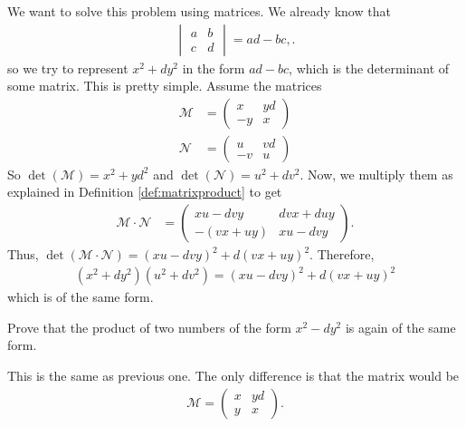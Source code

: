 \documentclass{subfile}
\begin{document}
\begin{solution}
We want to solve this problem using matrices. We already know that
	\begin{align*}
		\begin{vmatrix}
			a&b\\
			c&d
		\end{vmatrix} = ad-bc,
	.\end{align*}
so we try to represent $x^2+dy^2$ in the form $ad-bc$, which is the determinant of some matrix. This is pretty simple. Assume the matrices
	\begin{align*}
		\mathcal{M}
			& =
			\begin{pmatrix}
				x & yd\\
				-y & x
			\end{pmatrix}\\
		\mathcal{N}
			& =
			\begin{pmatrix}
				u & vd\\
				-v & u
			\end{pmatrix}
	\end{align*}
So $\det(\mathcal M)=x^2+yd^2$ and $\det(\mathcal{N})=u^2+dv^2$.
Now, we multiply them as explained in Definition \eqref{def:matrixproduct} to get
	\begin{align*}
		\mathcal{M}\cdot\mathcal{N}
			& =
			\begin{pmatrix}
				xu-dvy & dvx+duy\\
				-(vx+uy) & xu-dvy
			\end{pmatrix}.
	\end{align*}
Thus, $\det(\mathcal{M \cdot N})=(xu-dvy)^2+d(vx+uy)^2$. Therefore,
\begin{align*}
(x^2+dy^2)(u^2+dv^2)=(xu-dvy)^2+d(vx+uy)^2
\end{align*}
which is of the same form.
\end{solution}

\begin{problem}
Prove that the product of two numbers of the form $x^2-dy^2$ is again of the same form.
\end{problem}

\begin{solution}
This is the same as previous one. The only difference is that the matrix would be
\begin{align*}
\mathcal{M}=\begin{pmatrix}
x & yd\\
y & x
\end{pmatrix}.
\end{align*}
\end{solution}
\end{document}
